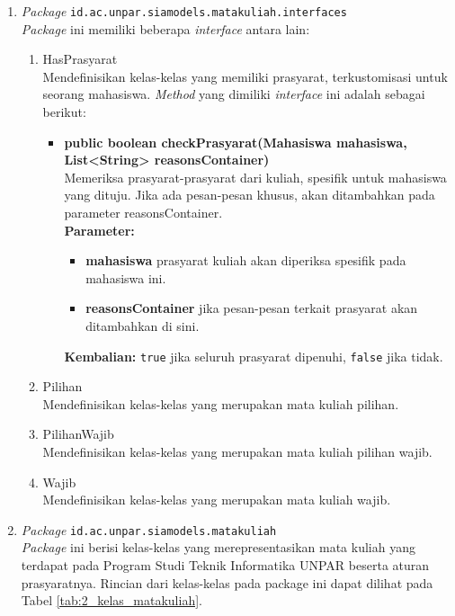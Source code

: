 \begin{enumerate}
	\item \textit{Package} \texttt{id.ac.unpar.siamodels.matakuliah.interfaces}\\
	\textit{Package} ini memiliki beberapa \textit{interface} antara lain:
	\begin{enumerate}
		\item HasPrasyarat\\
		Mendefinisikan kelas-kelas yang memiliki prasyarat, terkustomisasi untuk seorang mahasiswa. \textit{Method} yang dimiliki \textit{interface} ini adalah sebagai berikut: 
		\begin{itemize}
			\item \textbf{public boolean checkPrasyarat(Mahasiswa mahasiswa, List<String> reasonsContainer)} \\
			Memeriksa prasyarat-prasyarat dari kuliah, spesifik untuk mahasiswa yang dituju. Jika ada pesan-pesan khusus, akan ditambahkan pada parameter reasonsContainer.\\
			\textbf{Parameter:}
			\begin{itemize}
				\item \textbf{mahasiswa} prasyarat kuliah akan diperiksa spesifik pada mahasiswa ini.
				\item \textbf{reasonsContainer} jika pesan-pesan terkait prasyarat akan ditambahkan di sini.
			\end{itemize}
			\textbf{Kembalian:} \texttt{true} jika seluruh prasyarat dipenuhi, \texttt{false} jika tidak.
		\end{itemize}
		
		\item Pilihan\\
		Mendefinisikan kelas-kelas yang merupakan mata kuliah pilihan.
		\item PilihanWajib\\
		Mendefinisikan kelas-kelas yang merupakan mata kuliah pilihan wajib.
		\item Wajib\\
		Mendefinisikan kelas-kelas yang merupakan mata kuliah wajib.
	\end{enumerate}
	
	\item \textit{Package} \texttt{id.ac.unpar.siamodels.matakuliah}\\
	\textit{Package} ini berisi kelas-kelas yang merepresentasikan mata kuliah yang terdapat pada Program Studi Teknik Informatika UNPAR beserta aturan prasyaratnya. Rincian dari kelas-kelas pada package ini dapat dilihat pada Tabel \ref{tab:2_kelas_matakuliah}.


\end{enumerate}
